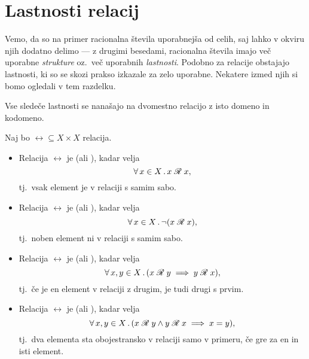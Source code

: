 	
	\section{Lastnosti relacij}\label{RAZDELEK: Lastnosti relacij}
	
		Vemo, da so na primer racionalna števila uporabnejša od celih, saj lahko v okviru njih dodatno delimo --- z drugimi besedami, racionalna števila imajo več uporabne \emph{strukture} oz.~več uporabnih \emph{lastnosti}. Podobno za relacije obstajajo lastnosti, ki so se skozi prakso izkazale za zelo uporabne. Nekatere izmed njih si bomo ogledali v tem razdelku.
		
		Vse sledeče lastnosti se nanašajo na dvomestno relacijo z isto domeno in kodomeno.
		
		\begin{definicija}
			Naj bo $\rel \subseteq X \times X$ relacija.
			\begin{itemize}
				\item
					Relacija $\rel$ je  (ali ), kadar velja
					\[\xall{x}[X]{\rel[x][x]},\]
					tj.~vsak element je v relaciji s samim sabo.
				\item
					Relacija $\rel$ je  (ali ), kadar velja
					\[\xall{x}[X]{\lnot(\rel[x][x])},\]
					tj.~noben element ni v relaciji s samim sabo.
				\item
					Relacija $\rel$ je  (ali ), kadar velja
					\[\all{x, y}[X]{\rel[x][y] \implies \rel[y][x]},\]
					tj.~če je en element v relaciji z drugim, je tudi drugi s prvim.
				\item
					Relacija $\rel$ je  (ali ), kadar velja
					\[\all{x, y}[X]{\rel[x][y] \land \rel[y][x] \implies x = y},\]
					tj.~dva elementa sta obojestransko v relaciji samo v primeru, če gre za en in isti element.
					

\end{itemize}
\end{definicija}

